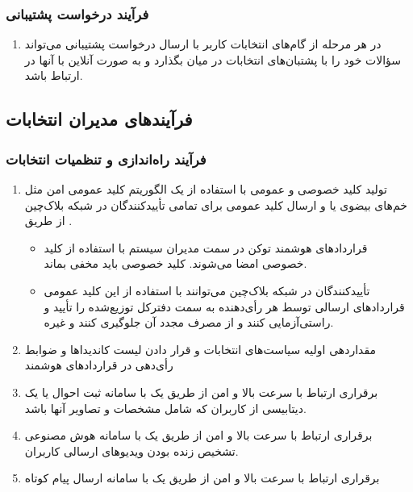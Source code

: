 \documentclass[12pt]{article}
\begin{document}
\subsubsection{فرآیند درخواست پشتیبانی}
\begin{enumerate}[label=(\arabic*)]
\item
در هر مرحله از گام‌های انتخابات کاربر با ارسال درخواست پشتیبانی می‌تواند سؤالات خود را با پشتبان‌های انتخابات در میان بگذارد و به صورت آنلاین با آنها در ارتباط باشد.  
\end{enumerate}



\subsection{فرآیندهای مدیران انتخابات}

\subsubsection{فرآیند راه‌اندازی و تنظمیات انتخابات}
\begin{enumerate}[label=(\arabic*)]
\item
تولید کلید خصوصی و عمومی با استفاده از یک الگوریتم کلید عمومی امن مثل خم‌های بیضوی یا  و ارسال کلید عمومی برای تمامی تأییدکنندگان 
 در شبکه بلاک‌چین از طریق 
 . 
 \begin{itemize}
\item
قراردادهای هوشمند  توکن  در سمت مدیران سیستم با استفاده از کلید خصوصی امضا می‌شوند. کلید خصوصی باید مخفی بماند. 
\item
 تأییدکنندگان 
 در شبکه بلاک‌چین می‌توانند با استفاده از این کلید عمومی قراردادهای ارسالی توسط هر رأی‌دهنده به سمت دفترکل توزیع‌شده را تأیید و راستی‌آزمایی کنند و از مصرف مجدد آن جلوگیری کنند و غیره. 
 \end{itemize}
\item
مقداردهی اولیه سیاست‌های انتخابات و قرار دادن لیست کاندیداها و ضوابط رأی‌دهی در قراردادهای هوشمند
\item
برقراری ارتباط با سرعت بالا و امن از طریق یک  با سامانه ثبت احوال یا یک دیتابیسی از کاربران که شامل مشخصات و تصاویر آنها باشد. 
\item
برقراری ارتباط با سرعت بالا و امن از طریق یک  با سامانه هوش مصنوعی تشخیص زنده بودن ویدیوهای ارسالی کاربران. 
\item
برقراری ارتباط با سرعت بالا و امن از طریق یک  با سامانه ارسال پیام کوتاه
\end{enumerate}
\end{document}
